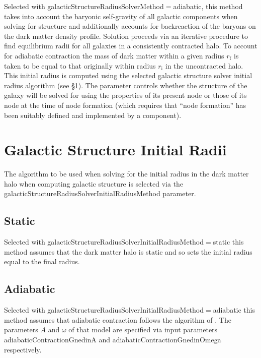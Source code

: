 Selected with {\normalfont \ttfamily galacticStructureRadiusSolverMethod}$=${\normalfont \ttfamily adiabatic}, this method takes into account the baryonic self-gravity of all galactic components when solving for structure and additionally accounts for backreaction of the baryons on the dark matter density profile.  Solution proceeds via an iterative procedure to find equilibrium radii for all galaxies in a consistently contracted halo. To account for adiabatic contraction the mass of dark matter within a given radius $r_{\mathrm f}$ is taken to be equal to that originally within radius $r_{\mathrm i}$ in the uncontracted halo. This initial radius is computed using the selected galactic structure solver initial radius algorithm (see \S\ref{sec:GalacticStructureInitialRadius}). The parameter {\normalfont \ttfamily [adiabaticContractionUseFormationHalo]} controls whether the structure of the galaxy will be solved for using the properties of its present \gls{node} or those of its \gls{node} at the time of \gls{node} formation (which requires that ``node formation'' has been suitably defined and implemented by a component).

\section{Galactic Structure Initial Radii}\label{sec:GalacticStructureInitialRadius}

The algorithm to be used when solving for the initial radius in the dark matter halo when computing galactic structure is selected via the {\normalfont \ttfamily galacticStructureRadiusSolverInitialRadiusMethod} parameter.

\subsection{Static}

Selected with {\normalfont \ttfamily galacticStructureRadiusSolverInitialRadiusMethod}$=${\normalfont \ttfamily static} this method assumes that the dark matter halo is static and so sets the initial radius equal to the final radius. 

\subsection{Adiabatic}

Selected with {\normalfont \ttfamily galacticStructureRadiusSolverInitialRadiusMethod}$=${\normalfont \ttfamily adiabatic} this method assumes that adiabatic contraction follows the algorithm of \cite{gnedin_response_2004}. The parameters $A$ and $\omega$ of that model are specified via input parameters {\normalfont \ttfamily adiabaticContractionGnedinA} and {\normalfont \ttfamily adiabaticContractionGnedinOmega} respectively.

